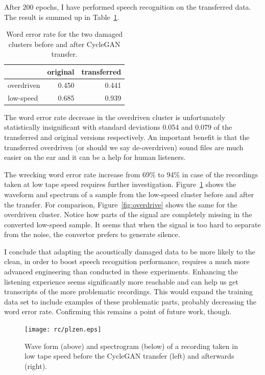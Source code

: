 \documentclass[hidelinks,12pt,a4paper]{report}
\begin{document}
After 200 epochs, I have performed speech recognition on the transferred data.
The result is summed up in Table~\ref{tab:results}.

\begin{table}[htpb]
\caption{Word error rate for the two damaged clusters before and after CycleGAN
transfer.}\label{tab:results}
\centering
\begin{tabular}{|l||r|r|}
\hline
           & original & transferred \\
\hline
overdriven & 0.450 & 0.441 \\
low-speed  & 0.685 & 0.939 \\
\hline
\end{tabular}
\end{table}

The word error rate decrease in the overdriven cluster is unfortunately statistically
insignificant with standard deviations 0.054 and 0.079 of the transferred and
original versions respectively. An important benefit is
that the transferred overdriven (or should we say de-overdriven) sound files are
much easier on the ear and it can be a help for human listeners.

The wrecking word error rate increase from 69\% to 94\% in case of the
recordings taken at low tape speed requires further investigation.
Figure~\ref{fig:plzen} shows the waveform and spectrum of a sample from the low-speed
cluster before and after the transfer. For comparison,
Figure~\ref{fig:overdrive} shows the same for the overdriven cluster.
Notice how parts of the signal are completely missing in the converted low-speed
sample. It seems that when the signal is too hard to separate from the noise,
the convertor prefers to generate silence.

I conclude that adapting the acoustically damaged data to be more likely to the
clean, in order to boost speech recognition performance, requires a much more
advanced engineering than conducted in these experiments. Enhancing the
listening experience seems significantly more reachable and can help us get
transcripts of the more problematic recordings. This would expand the training
data set to include examples of these problematic parts, probably decreasing the
word error rate. Confirming this remains a point of future work, though.

\begin{figure}[tpb]
\centering
\texttt{[image: rc/plzen.eps]}
\caption{Wave form (above) and spectrogram (below) of a recording taken in low
tape speed before the CycleGAN transfer (left) and afterwards (right).}
\label{fig:plzen}
\end{figure}
\end{document}

